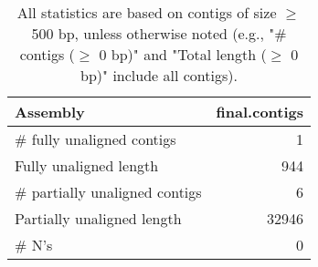 \documentclass[12pt,a4paper]{article}
\begin{document}
\begin{table}[ht]
\begin{center}
\caption{All statistics are based on contigs of size $\geq$ 500 bp, unless otherwise noted (e.g., "\# contigs ($\geq$ 0 bp)" and "Total length ($\geq$ 0 bp)" include all contigs).}
\begin{tabular}{|l*{1}{|r}|}
\hline
Assembly & final.contigs \\ \hline
\# fully unaligned contigs & 1 \\ \hline
Fully unaligned length & 944 \\ \hline
\# partially unaligned contigs & 6 \\ \hline
Partially unaligned length & 32946 \\ \hline
\# N's & 0 \\ \hline
\end{tabular}
\end{center}
\end{table}
\end{document}
